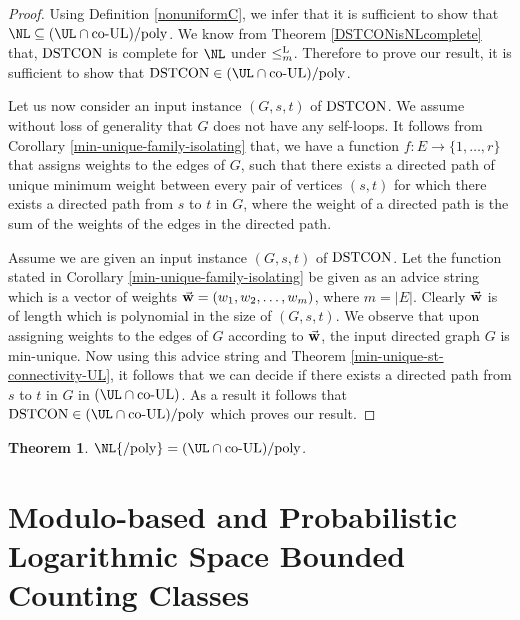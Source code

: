 \documentclass{amsbook}
\newtheorem{theorem}{Theorem}[chapter]
\theoremstyle{definition}
\theoremstyle{remark}
\numberwithin{section}{chapter}
\numberwithin{equation}{chapter}
\newcommand{\Lredn}{\leq^{\small{\rm L}}_m}
\newcommand{\coUL}{\mbox{\rm co-UL}}
\newcommand{\DSTCON}{\mbox{\rm DSTCON}}
\newcommand{\NLpoly}{\mbox{\ensuremath{\NL{\rm /poly}}}}
\begin{document}
\begin{proof}
Using Definition \ref{nonuniformC}, we infer that it is sufficient to show that $\NL\subseteq (\UL\cap\coUL){\rm /poly}$. We know from Theorem \ref{DSTCONisNLcomplete} that, $\DSTCON$ is complete for $\NL$ under $\Lredn$. Therefore to prove our result, it is sufficient to show that $\DSTCON\in(\UL\cap\coUL){\rm /poly}$.

Let us now consider an input instance $(G,s,t)$ of $\DSTCON$. We assume without loss of generality that $G$ does not have any self-loops. It follows from Corollary \ref{min-unique-family-isolating} that, we have a function $f:E\rightarrow\{1,\ldots ,r\}$ that assigns weights to the edges of $G$, such that there exists a directed path of unique minimum weight between every pair of vertices $(s,t)$ for which there exists a directed path from $s$ to $t$ in $G$, where the weight of a directed path is the sum of the weights of the edges in the directed path.

Assume we are given an input instance $(G,s,t)$ of $\DSTCON$. Let the function stated in Corollary \ref{min-unique-family-isolating} be given as an advice string which is a vector of weights $\vec{\rm\bf w}=(w_1,w_2,\ldots ,w_m)$, where $m=|E|$. Clearly $\vec{\rm\bf w}$ is of length which is polynomial in the size of $(G,s,t)$. We observe that upon assigning weights to the edges of $G$ according to $\vec{\rm\bf w}$, the input directed graph $G$ is min-unique. Now using this advice string and Theorem \ref{min-unique-st-connectivity-UL}, it follows that we can decide if there exists a directed path from $s$ to $t$ in $G$ in $(\UL\cap\coUL )$. As a result it follows that 
$\DSTCON\in(\UL\cap\coUL){\rm /poly}$ which proves our result.
\end{proof}
\begin{theorem}
$\NLpoly=(\UL\cap\coUL){\rm /poly}$.
\end{theorem}

\chapter{Modulo-based and Probabilistic Logarithmic Space Bounded Counting Classes}
\end{document}
